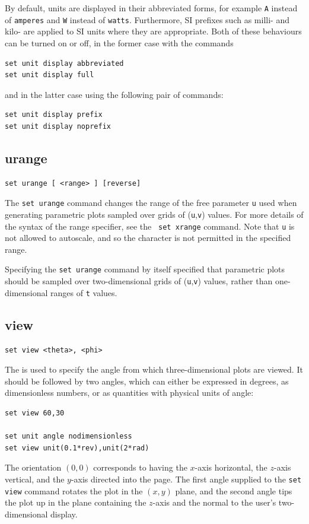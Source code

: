 By default, units are displayed in their abbreviated forms, for example {\tt A}
instead of {\tt amperes} and {\tt W} instead of {\tt watts}. Furthermore, SI
prefixes such as milli- and kilo- are applied to SI units where they are
appropriate. Both of these behaviours can be turned on or off, in the former
case with the commands

\begin{verbatim}
set unit display abbreviated
set unit display full
\end{verbatim}

\noindent and in the latter case using the following pair of commands:

\begin{verbatim}
set unit display prefix
set unit display noprefix
\end{verbatim}


\subsection{urange}

\begin{verbatim}
set urange [ <range> ] [reverse]
\end{verbatim}

The {\tt set urange} command changes the range of the free parameter {\tt u}
used when generating parametric plots sampled over grids of ({\tt u},{\tt v})
values.  For more details of the syntax of the range specifier, see the {\tt
set xrange} command. Note that {\tt u} is not allowed to autoscale, and so the
{\tt *} character is not permitted in the specified range.

Specifying the {\tt set urange} command by itself specified that parametric
plots should be sampled over two-dimensional grids of ({\tt u},{\tt v}) values,
rather than one-dimensional ranges of {\tt t} values.


\subsection{view}

\begin{verbatim}
set view <theta>, <phi>
\end{verbatim}

The  is used to specify the angle from which
three-dimensional plots are viewed. It should be followed by two angles, which
can either be expressed in degrees, as dimensionless numbers, or as quantities
with physical units of angle:
\begin{verbatim}
set view 60,30

set unit angle nodimensionless
set view unit(0.1*rev),unit(2*rad)
\end{verbatim}
The orientation $(0,0)$ corresponds to having the $x$-axis horizontal, the
$z$-axis vertical, and the $y$-axis directed into the page. The first angle
supplied to the {\tt set view} command rotates the plot in the $(x,y)$ plane,
and the second angle tips the plot up in the plane containing the $z$-axis and
the normal to the user's two-dimensional display.


